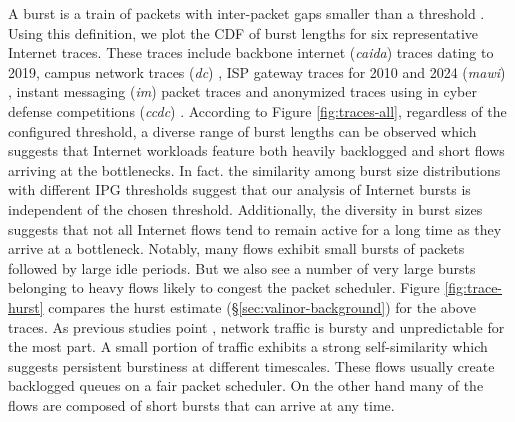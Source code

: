 A burst is a train of packets with inter-packet gaps smaller than a threshold \cite{bullet}. Using this definition, we plot the CDF of burst lengths for six representative Internet traces. These traces include backbone internet (\textit{caida}) \cite{caida} traces dating to 2019, campus network traces (\textit{dc}) \cite{wild}, ISP gateway traces for 2010 and 2024 (\textit{mawi}) \cite{mawi}, instant messaging (\textit{im}) \cite{im} packet traces and anonymized traces using in cyber defense competitions (\textit{ccdc}) \cite{ccdc}. According to Figure \ref{fig:traces-all}, regardless of the configured threshold, a diverse range of burst lengths can be observed which suggests that Internet workloads feature both heavily backlogged and short flows arriving at the bottlenecks. In fact. the similarity among burst size distributions with different IPG thresholds suggest that our analysis of Internet bursts is independent of the chosen threshold. Additionally,  the diversity in burst sizes suggests that not all Internet flows tend to remain active for a long time as they arrive at a bottleneck. Notably, many flows exhibit small bursts of packets followed by large idle periods. But we also see a number of very large bursts belonging to heavy flows likely to congest the packet scheduler.
Figure \ref{fig:trace-hurst} compares the hurst estimate (\S\ref{sec:valinor-background}) for the above traces. As previous studies point \cite{high-resolution}, network traffic is bursty and unpredictable for the most part. A small portion of traffic exhibits a strong self-similarity which suggests persistent burstiness at different timescales. These flows usually create backlogged queues on a fair packet scheduler. On the other hand many of the flows are composed of short bursts that can arrive at any time.

 



